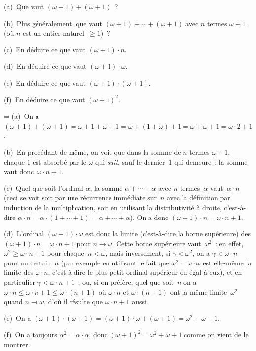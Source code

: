 \documentclass[12pt,a4paper]{article}
\theoremstyle{definition}
\newif\ifcorrige
\newenvironment{corrige}%
{\ifcorrige\relax\else\setbox0=\vbox\bgroup\fi%
\smallbreak\noindent{\underbar{\textit{Corrigé.}}\quad}}
{{\hbox{}\nobreak\hfill\checkmark}%
\ifcorrige\relax\else\egroup\fi\par}
\begin{document}
(a) Que vaut $(\omega+1) + (\omega+1)$ ?

(b) Plus généralement, que vaut $(\omega+1) + \cdots + (\omega+1)$
avec $n$ termes $\omega+1$ (où $n$ est un entier naturel $\geq 1$) ?

(c) En déduire ce que vaut $(\omega+1)\cdot n$.

(d) En déduire ce que vaut $(\omega+1)\cdot \omega$.

(e) En déduire ce que vaut $(\omega+1)\cdot(\omega+1)$.

(f) En déduire ce que vaut $(\omega+1)^2$.

\begin{corrige}
(a) On a $(\omega+1) + (\omega+1) = \omega + 1 + \omega + 1 = \omega +
  (1 + \omega) + 1 = \omega + \omega + 1 = \omega\cdot 2 + 1$.

(b) En procédant de même, on voit que dans la somme de $n$ termes
  $\omega + 1$, chaque $1$ est absorbé par le $\omega$ qui
  \emph{suit}, sauf le dernier $1$ qui demeure : la somme vaut
  donc $\omega\cdot n + 1$.

(c) Quel que soit l'ordinal $\alpha$, la somme $\alpha + \cdots +
  \alpha$ avec $n$ termes $\alpha$ vaut $\alpha\cdot n$ (ceci se voit
  soit par une récurrence immédiate sur $n$ avec la définition par
  induction de la multiplication, soit en utilisant la distributivité
  à droite, c'est-à-dire $\alpha\cdot n = \alpha\cdot(1 + \cdots + 1)
  = \alpha + \cdots + \alpha$).  On a donc $(\omega+1)\cdot n =
  \omega\cdot n + 1$.

(d) L'ordinal $(\omega+1)\cdot \omega$ est donc la limite
  (c'est-à-dire la borne supérieure) des $(\omega+1)\cdot n =
  \omega\cdot n + 1$ pour $n\to\omega$.  Cette borne supérieure
  vaut $\omega^2$ : en effet, $\omega^2 \geq \omega\cdot n + 1$ pour
  chaque $n<\omega$, mais inversement, si $\gamma < \omega^2$, on a
  $\gamma < \omega\cdot n$ pour un certain $n$ (par exemple en
  utilisant le fait que $\omega^2 = \omega\cdot\omega$ est elle-même
  la limite des $\omega\cdot n$, c'est-à-dire le plus petit ordinal
  supérieur ou égal à eux), et en particulier $\gamma < \omega\cdot n
  + 1$ ; ou, si on préfère, quel que soit $n$ on a $\omega\cdot n \leq
  \omega\cdot n + 1 \leq \omega\cdot (n + 1)$ où $\omega\cdot n$ et
  $\omega\cdot (n+1)$ ont la même limite $\omega^2$ quand
  $n\to\omega$, d'où il résulte que $\omega\cdot n + 1$ aussi.

(e) On a $(\omega+1)\cdot (\omega+1) = (\omega+1)\cdot \omega +
  (\omega + 1) = \omega^2 + \omega + 1$.

(f) On a toujours $\alpha^2 = \alpha\cdot\alpha$, donc $(\omega+1)^2 =
  \omega^2 + \omega + 1$ comme on vient de le montrer.
\end{corrige}
\end{document}
